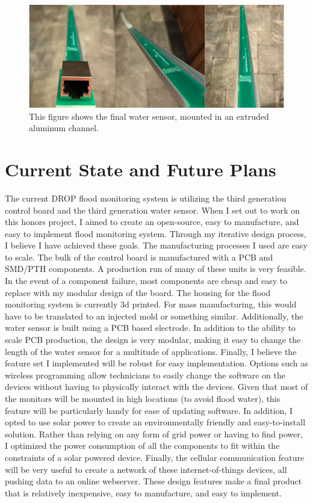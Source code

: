 \documentclass[letter]{article}
\begin{document}
\begin{figure}[ht]
	\centering
	\includegraphics[width=1\textwidth]{img/v3_waterSensorCollage.png}
	\caption{\label{fig:v3_waterSensorCollage} This figure shows the final water sensor, mounted in an extruded aluminum channel.}
\end{figure}

\section{Current State and Future Plans}

The current DROP flood monitoring system is utilizing the third generation control board and the third generation water sensor. When I set out to work on this honors project, I aimed to create an open-source, easy to manufacture, and easy to implement flood monitoring system. Through my iterative design process, I believe I have achieved these goals. The manufacturing processes I used are easy to scale. The bulk of the control board is manufactured with a PCB and SMD/PTH components. A production run of many of these units is very feasible. In the event of a component failure, most components are cheap and easy to replace with my modular design of the board. The housing for the flood monitoring system is currently 3d printed. For mass manufacturing, this would have to be translated to an injected mold or something similar. Additionally, the water sensor is built using a PCB based electrode. In addition to the ability to scale PCB production, the design is very modular, making it easy to change the length of the water sensor for a multitude of applications. Finally, I believe the feature set I implemented will be robust for easy implementation. Options such as wireless programming allow technicians to easily change the software on the devices without having to physically interact with the devices. Given that most of the monitors will be mounted in high locations (to avoid flood water), this feature will be particularly handy for ease of updating software. In addition, I opted to use solar power to create an environmentally friendly and easy-to-install solution. Rather than relying on any form of grid power or having to find power, I optimized the power consumption of all the components to fit within the constraints of a solar powered device. Finally, the cellular communication feature will be very useful to create a network of these internet-of-things devices, all pushing data to an online webserver. These design features make a final product that is relatively inexpensive, easy to manufacture, and easy to implement. 
\end{document}
